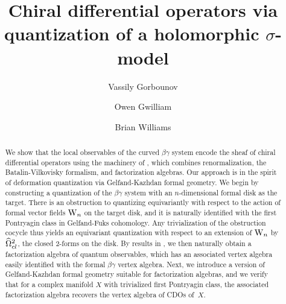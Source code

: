 \documentclass[10pt]{amsart}
\title{Chiral differential operators via\\quantization of a holomorphic $\sigma$-model}
\author{Vassily Gorbounov}
\author{Owen Gwilliam}
\author{Brian Williams}
\begin{document}
\maketitle

\begin{abstract}
We show that the local observables of the curved $\beta\gamma$ system
encode the sheaf of chiral differential operators using the machinery of \cite{CG}, 
which combines renormalization, the Batalin-Vilkovisky formalism, and factorization algebras. 
Our approach is in the spirit of deformation quantization via Gelfand-Kazhdan formal geometry.
We begin by constructing a quantization of the $\beta\gamma$ system with an $n$-dimensional formal disk as the target. There is an obstruction to quantizing equivariantly with respect to the action of formal vector fields ${{\rm W}_n}$ on the target disk, and it is naturally identified with the first Pontryagin class in Gelfand-Fuks cohomology.
Any trivialization of the obstruction cocycle thus yields an equivariant quantization with respect to an extension of ${{\rm W}_n}$ by $\widehat{\Omega}^2_{cl}$, the closed 2-forms on the disk. By results in \cite{CG}, we then naturally obtain a factorization algebra of quantum observables, which has an associated vertex algebra easily identified with the formal $\beta\gamma$ vertex algebra. Next, we introduce a version of Gelfand-Kazhdan formal geometry suitable for factorization algebras, and we verify that for a complex manifold $X$ with trivialized first Pontryagin class, the associated factorization algebra recovers the vertex algebra of CDOs of~$X$.\\
\end{abstract}


\tableofcontents







\end{document}
